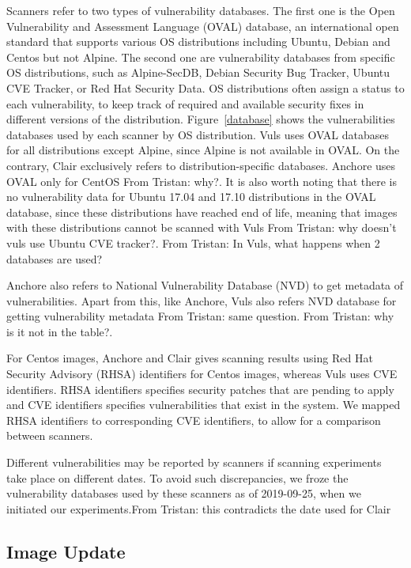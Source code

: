 \documentclass[a4paper,num-refs]{oup-contemporary}
\newcommand{\tristan}[1]{\color{blue}From Tristan: #1\color{black}}
\begin{document}
Scanners refer to two types of vulnerability databases. The first one is
the Open Vulnerability and Assessment Language (OVAL) database, an
international open standard that supports various OS distributions
including Ubuntu, Debian and Centos but not Alpine. The second one are vulnerability
databases from specific OS distributions, such as Alpine-SecDB, Debian
Security Bug Tracker, Ubuntu CVE Tracker, or Red Hat Security Data. OS
distributions often assign a status to each vulnerability, to keep track of
required and available security fixes in different versions of the
distribution. Figure~\ref{database} shows the vulnerabilities databases used by each scanner 
by OS distribution. Vuls uses OVAL databases for all distributions except Alpine, since Alpine is not available in OVAL. On the contrary, 
Clair exclusively refers to distribution-specific databases. Anchore uses OVAL only for CentOS \tristan{why?}. It is also worth noting that there is
no vulnerability data for Ubuntu 17.04 and 17.10 distributions in the OVAL database, since these distributions have reached end of life, meaning that images
with these distributions cannot be scanned with Vuls \tristan{why doesn't vuls use Ubuntu CVE tracker?}.
\tristan{In Vuls, what happens when 2 databases are used?}

Anchore also refers to National Vulnerability Database (NVD) to get
metadata of vulnerabilities. Apart from this, like Anchore, Vuls also
refers NVD database for getting vulnerability metadata \tristan{same
question}. \tristan{why is it not in the table?}.

For Centos images, Anchore and Clair gives scanning results using Red Hat
Security Advisory (RHSA) identifiers for Centos images, whereas Vuls uses
CVE identifiers. RHSA identifiers specifies security patches that are
pending to apply and CVE identifiers specifies vulnerabilities that exist
in the system. We mapped RHSA identifiers to corresponding CVE identifiers,
to allow for a comparison between scanners.

Different vulnerabilities may be
reported by scanners if scanning experiments take place on different dates.
To avoid such discrepancies, we froze the vulnerability
databases used by these scanners as of 2019-09-25, when we initiated our
experiments.\tristan{this contradicts the date used for Clair}

\subsection{Image Update}
\end{document}
